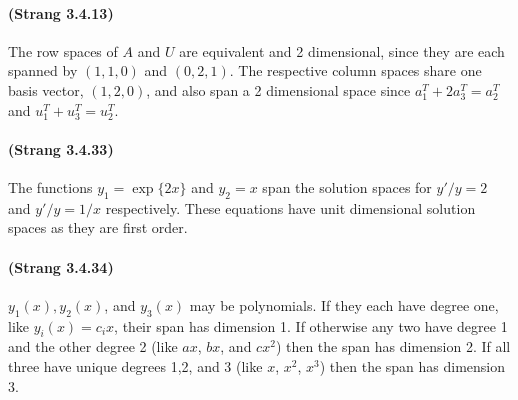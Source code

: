 \documentclass[10pt]{article}
\begin{document}
\paragraph{(Strang 3.4.13)}
The row spaces of $A$ and $U$ are equivalent and 2 dimensional, since they are each spanned by $(1,1,0)$ and $(0,2,1)$. The respective column spaces share one basis vector, $(1,2,0)$, and also span a 2 dimensional space since $a_{1}^{T} + 2a_{3}^{T} = a_{2}^{T}$ and $u_{1}^{T} + u_{3}^{T} = u_{2}^{T}$. 

\paragraph{(Strang 3.4.33)}
The functions $y_1 = \exp\{2x\}$ and $y_2 = x$ span the solution spaces for $y'/y=2$ and $y'/y=1/x$ respectively. These  equations have unit dimensional solution spaces as they are first order.

\paragraph{(Strang 3.4.34)}
$y_1(x),y_2(x)$, and $y_3(x)$ may be polynomials. If they each have degree one, like $y_i(x)=c_i x$, their span has dimension 1.  If otherwise any two have degree 1 and the other degree 2 (like $ax$, $bx$, and $cx^2$) then the span has dimension 2. If all three have unique degrees 1,2, and 3 (like $x$, $x^2$, $x^3$) then the span has dimension 3.
\end{document}
